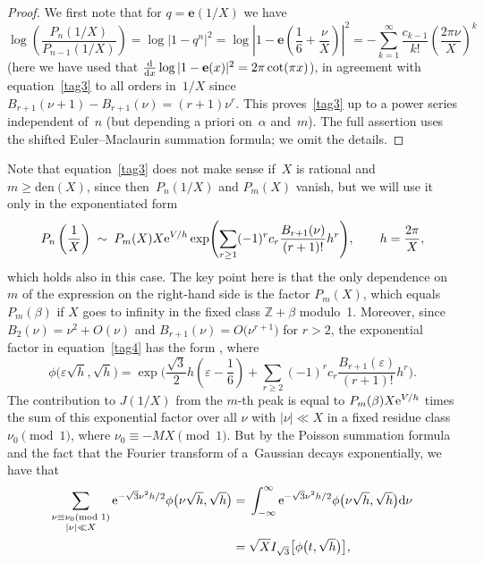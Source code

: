 \documentclass[pdftex]{sigma}
\numberwithin{equation}{section}
\def\e{\mathbf{e}}
\def\a{\alpha}
\def\Z{\mathbb Z}
\def\m{ - }
\def\si{\;\sim\;}
\def\e{\mathbf{e}}
\def\a{\alpha}
\def\b{\beta}
\def\v{\varepsilon}
\def\den{\mathrm{den}}
\def\O{O}
\def\J{\mathbf J} \def\J{J} %
\begin{document}
\begin{proof}
We first note that for $q=\e(1/X)$ we have
\[
\log\left(\frac{P_n(1/X)}{P_{n-1}(1/X)}\right)
= \log\bigl|1\m q^n\bigr|^2 = \log\left|1\m \e\left(\frac16 +\frac\nu X \right)\right|^2
= -\sum_{k=1}^\infty \frac{c_{k-1}}{k!} \left(\frac{2\pi\nu}X\right)^k
\]
(here we have used that $\frac {\rm d}{{\rm d}x}\log|1-\e(x)|^2=2\pi\cot(\pi x) $),
in agreement with equation~\eqref{tag3} to all orders in~$1/X$ since
$B_{r+1}(\nu+1)-B_{r+1}(\nu)= (r+1)\nu^r$. This proves~\eqref{tag3} up to a power
series independent of~$n$ (but depending a priori on~$\a$ and~$m$). The
full assertion uses the shifted Euler--Maclaurin summation formula; we omit the details.
\end{proof}

Note that equation~\eqref{tag3} does not make sense if~$X$ is rational and $m\ge\den(X)$,
since then~$P_n(1/X)$ and $P_m(X)$ vanish, but we will use it only in the
exponentiated form
\begin{equation}
\label{tag4}
P_n\left(\frac1X\right) \si P_m(X) X {\rm e}^{V/h}
\exp\Biggl( \sum_{r\ge1} (-1)^rc_{r} \frac{B_{r+1}(\nu)}{(r+1)!} h^r\Biggr),
\qquad h=\frac{2\pi}X ,
\end{equation}
which holds also in this case. The key point here is that the only
dependence on~$m$ of the expression on the right-hand
side is the factor $P_m(X)$, which equals $P_m(\b)$ if $X$ goes to infinity
in the fixed class $\Z+\b$ modulo~1.
Moreover, since $B_2(\nu) = \nu^2+\O(\nu)$ and $B_{r+1}(\nu)=\O\big(\nu^{r+1}\big)$ for
$r>2$, the exponential factor in equation~\eqref{tag4} has
the form , where
\[%
\phi\big(\v\sqrt h,\sqrt h\big)=
\exp\bigg(\frac{\sqrt{3}}{2} h \left(\v-\frac{1}{6} \right)+
\sum_{r\ge 2} (-1)^rc_{r} \frac{B_{r+1}(\v)}{(r+1)!} h^r\bigg)
 .
\]
The contribution to $\J(1/X)$ from the $m$-th peak is equal to $P_m(\b)X{\rm e}^{V/h}$ times
the sum of this exponential factor over all $\nu$ with $|\nu|\ll X$ in a fixed residue
class $\nu_0\pmod1$, where $\nu_0\equiv-MX\pmod1$. But by the Poisson summation
formula and the fact that the Fourier transform of a~Gaussian decays
exponentially, we have that
\begin{align}
\sum_{\substack{\nu\equiv\nu_0 \text{(mod~1)}\\|\nu|\ll X}}
{\rm e}^{-\sqrt 3\nu^2h/2}\phi\big(\nu\sqrt h,\sqrt h\big)
={}& \int_{-\infty}^\infty {\rm e}^{-\sqrt 3 \nu^2h/2}\phi\big(\nu\sqrt h,\sqrt h\big) {\rm d}\nu\nonumber\\
= {}&\sqrt X I_{\sqrt3}\bigl[\phi\big(t,\sqrt h\big)\bigr] ,\label{VZ}
\end{align}
\end{document}
